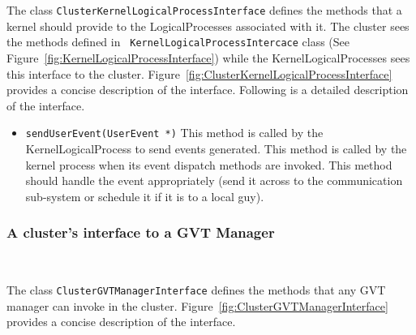 The class {\tt ClusterKernelLogicalProcessInterface} defines the methods
that a kernel should provide to the LogicalProcesses associated with
it. The cluster sees the methods defined in {\tt
KernelLogicalProcessIntercace} class (See
Figure~\ref{fig:KernelLogicalProcessInterface}) while the
KernelLogicalProcesses sees this interface to the
cluster. Figure~\ref{fig:ClusterKernelLogicalProcessInterface} provides a
concise description of the interface. Following is a detailed description
of the interface.

\begin{itemize}
\item {\tt sendUserEvent(UserEvent *)} This method is called by the
  KernelLogicalProcess to send events generated. This method is called
  by the kernel process when its event dispatch methods are invoked. This
  method should handle the event appropriately (send it across to the
  communication sub-system or schedule it if it is to a local guy).
\end{itemize}

\subsubsection{A cluster's interface to a GVT Manager}

\begin{figure*}
\begin{center}
\ 
\end{center}
\caption{The interface a cluster should provide to a GVT
  manager.}\label{fig:ClusterGVTManagerInterface}   
\end{figure*}

The class {\tt ClusterGVTManagerInterface} defines the methods that any
GVT manager can invoke in the cluster.
Figure~\ref{fig:ClusterGVTManagerInterface} provides a concise description
of the interface.


